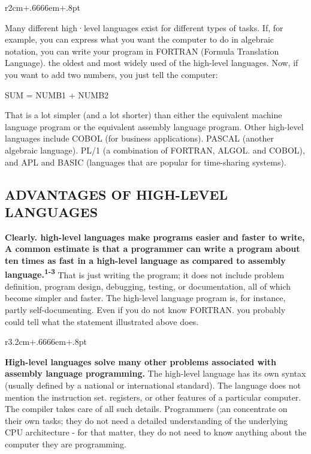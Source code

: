\documentclass{book}
\begin{document}
\begin{wrapfigure}{r}{2cm+.6666em+.8pt}
\end{wrapfigure}
Many different high·level languages exist for different types of tasks. If, for example, you can express what you want the computer to do in algebraic notation, you can write your program in FORTRAN (Formula Translation Language). the oldest and most widely used of the high-level languages. Now, if you want to add two numbers, you just tell the computer:
\begin{center}
SUM = NUMB1 + NUMB2
\end{center}
That is a lot simpler (and a lot shorter) than either the equivalent machine language program or the equivalent assembly language program. Other high-level languages include COBOL (for business applications). PASCAL (another algebraic language). PL/1 (a combination of FORTRAN, ALGOL. and COBOL), and APL and BASIC (languages that are popular for time-sharing systems).

\subsection*{ADVANTAGES OF HIGH-LEVEL LANGUAGES}

\textbf{Clearly. high-level languages make programs easier and faster to write, A common estimate is that a programmer can write a program about ten times as fast in a high-level language as compared to assembly language.\textsuperscript{1-3}} That is just writing the program; it does not include problem definition, program design, debugging, testing, or documentation, all of which become simpler and faster. The high-level language program is, for instance, partly self-documenting. Even if you do not know FORTRAN. you probably could tell what the statement illustrated above does.

\begin{wrapfigure}{r}{3.2cm+.6666em+.8pt}
\end{wrapfigure}
\textbf{High-level languages solve many other problems associated with assembly language programming.} The high-level language has its own syntax (usually defined by a national or international standard). The language does not mention the instruction set. registers, or other features of a particular computer. The compiler takes care of all such details. Programmers (;an concentrate on their own tasks; they do not need a detailed understanding of the underlying CPU architecture - for that matter, they do not need to know anything about the computer they are
programming.
\end{document}
